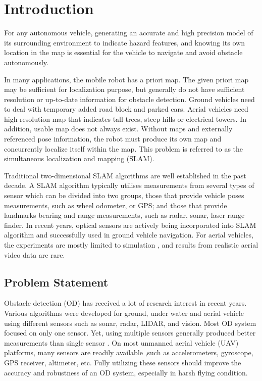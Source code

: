 \chapter{Introduction} \label{ch:intro}
For any autonomous vehicle, generating an accurate and high precision
model of its surrounding environment to indicate hazard features, and
knowing its own location in the map is essential for the vehicle to
navigate and avoid obstacle autonomously.

In many applications, the mobile robot has a priori map. The given
priori map may be sufficient for localization purpose, but generally
do not have sufficient resolution or up-to-date information for
obstacle detection. Ground vehicles need to deal with temporary added
road block and parked cars. Aerial vehicles need high resolution map
that indicates tall trees, steep hills or electrical towers. In
addition, usable map does not always exist. Without maps and
externally referenced pose information, the robot must produce its own
map and concurrently localize itself within the map. This problem is
referred to as the simultaneous localization and mapping (SLAM).

Traditional two-dimensional SLAM algorithms are well established in
the past decade. A SLAM algorithm typically utilises measurements from
several types of sensor which can be divided into two groups, those
that provide vehicle poses measurements, such as wheel odometer, or
GPS; and those that provide landmarks bearing and range measurements,
such as radar, sonar, laser range finder. In recent years, optical
sensors are actively being incorporated into SLAM algorithm and
successfully used in ground vehicle navigation. For aerial vehicles,
the experiments are mostly limited to
simulation\cite{nemra_robust_2010} \cite{jianli_unscented_2011}
\cite{sunderhauf_using_2007} \cite{artieda_visual_2009}, and results
from realistic aerial video data are rare.

\section{Problem Statement}\label{section:ProblemStatement}
Obstacle detection (OD) has received a lot of research interest in
recent years. Various algorithms were developed for ground, under
water and aerial vehicle using different sensors such as sonar, radar,
LIDAR, and vision. Most OD system focused on only one sensor. Yet,
using multiple sensors generally produced better measurements than
single sensor \cite{smith_approaches_2006}. On most unmanned aerial
vehicle (UAV) platforms, many sensors are readily available ,such as
accelerometers, gyroscope, GPS receiver, altimeter, etc. Fully
utilizing these sensors should improve the accuracy and robustness of
an OD system, especially in harsh flying condition.

